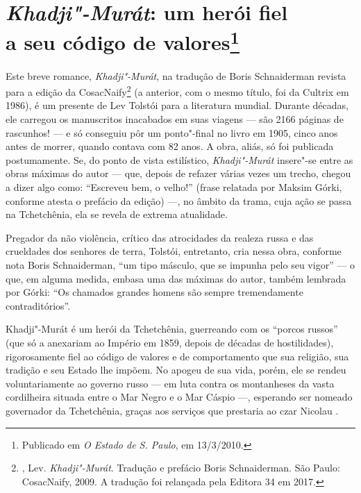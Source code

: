 \chapter{\emph{Khadji"-Murát}: um herói fiel\\
a seu código de valores\footnote{Publicado em \emph{O Estado de S. Paulo}, em
  13/3/2010.}}
  \label{khadji}

Este breve romance, \emph{Khadji"-Murát}, na tradução de Boris
Schnaiderman revista para a edição da CosacNaify\footnote{,
  Lev. \emph{Khadji"-Murát}. Tradução e prefácio Boris Schnaiderman. São
  Paulo: CosacNaify, 2009. A tradução foi relançada pela Editora 34 em 2017.} (a anterior, com o mesmo título,
foi da Cultrix em 1986), é um presente de Lev Tolstói para a literatura
mundial. Durante décadas, ele carregou os manuscritos inacabados em suas
viagens --- são 2166 páginas de rascunhos! --- e só conseguiu pôr um
ponto"-final no livro em 1905, cinco anos antes de morrer, quando contava
com 82 anos. A obra, aliás, só foi publicada postumamente. Se, do ponto
de vista estilístico, \emph{Khadji"-Murát} insere"-se entre as
obras máximas do autor --- que, depois de refazer várias vezes um trecho,
chegou a dizer algo como: ``Escreveu bem, o velho!'' (frase relatada por
Maksim Górki, conforme atesta o prefácio da edição) ---, no âmbito da
trama, cuja ação se passa na Tchetchênia, ela se revela de extrema
atualidade.

Pregador da não violência, crítico das atrocidades da realeza russa e
das crueldades dos senhores de terra, Tolstói, entretanto, cria nessa
obra, conforme nota Boris Schnaiderman, ``um tipo másculo, que se impunha
pelo seu vigor'' --- o que, em alguma medida, embasa uma das máximas do
autor, também lembrada por Górki: ``Os chamados grandes homens são sempre
tremendamente contraditórios''.

Khadji"-Murát é um herói da Tchetchênia, guerreando com os ``porcos
russos'' (que só a anexariam ao Império em 1859, depois de décadas de
hostilidades), rigorosamente fiel ao código de valores e de
comportamento que sua religião, sua tradição e seu Estado lhe impõem. No
apogeu de sua vida, porém, ele se rendeu voluntariamente ao governo
russo --- em luta contra os montanheses da vasta cordilheira situada
entre o Mar Negro e o Mar Cáspio ---, esperando ser nomeado governador da
Tchetchênia, graças aos serviços que prestaria ao czar Nicolau .

